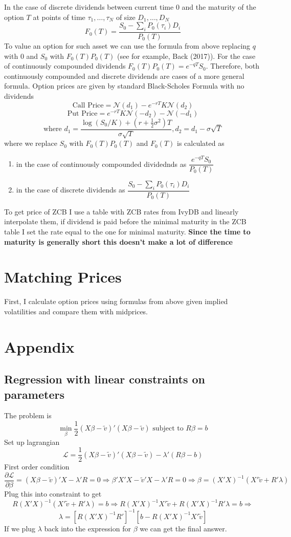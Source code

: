 \documentclass[12pt]{article}
\newcommand{\parder}[2]{\frac{\partial #1}{\partial #2}}
\begin{document}
In the case of discrete dividends between current time $0$ and the maturity of the option $T$ at points of time $\tau_1,\dots, \tau_N$ of size $D_1,\dots, D_N$
\[F_0(T) = \frac{S_0 - \sum_{i}P_0(\tau_{i})D_i}{P_0(T)}\]
To value an option for such asset we can use the formula from above replacing $q$ with $0$ and $S_0$ with $F_0(T)P_0(T)$ (see for example, Back (2017)). For the case of continuously compounded dividends $F_0(T)P_0(T) = e^{-qT}S_0$. Therefore, both continuously compounded and discrete dividends are cases of a more general formula. Option prices are given by standard Black-Scholes Formula with no dividends
\[\text{Call Price} = \mathcal{N}(d_1)-e^{-rT}K\mathcal{N}(d_2)\]
\[\text{Put Price} = e^{-rT}K\mathcal{N}(-d_2) - \mathcal{N}(-d_1)\]
\[\text{where } d_1 = \frac{\log(S_0/K) + (r + \frac{1}{2}\sigma^2)T}{\sigma\sqrt{T}}, d_2 = d_1 - \sigma\sqrt{T}\]
where we replace $S_0$ with $F_0(T)P_0(T)$ and $F_0(T)$ is calculated as
\begin{enumerate}
	\item in the case of continuously compounded dividednds as $\dfrac{e^{-qT}S_0}{P_0(T)}$
	\item in the case of discrete dividends as $\dfrac{S_0 - \sum_{i}P_0(\tau_{i})D_i}{P_0(T)}$
\end{enumerate}

To get price of ZCB I use a table with ZCB rates from IvyDB and linearly interpolate them, if dividend is paid before the minimal maturity in the ZCB table I set the rate equal to the one for minimal maturity. \textbf{\color{red} Since the time to maturity is generally short this doesn't make a lot of difference}

\section{Matching Prices}

First, I calculate option prices using formulas from above given implied volatilities and compare them with midprices.
	



\section{Appendix}

\subsection{Regression with linear constraints on parameters}

The problem is 
\[\min_{\beta} \frac{1}{2}(X\beta - \tilde{v})'(X\beta - \tilde{v}) \text{ subject to } R\beta = b\]
Set up lagrangian
\[\mathcal{L} = \frac{1}{2}(X\beta - \tilde{v})'(X\beta - \tilde{v}) - \lambda' (R\beta - b)\]
First order condition
\[\parder{\mathcal{L}}{\beta} = (X\beta - \tilde{v})'X - \lambda' R = 0 \Rightarrow \beta'X'X - \tilde{v}'X - \lambda'R = 0 \Rightarrow \beta = (X'X)^{-1}(X'\tilde{v} + R'\lambda)\]
Plug this into constraint to get
\[R(X'X)^{-1}(X'\tilde{v} + R'\lambda) = b \Rightarrow R(X'X)^{-1}X'\tilde{v} + R(X'X)^{-1}R'\lambda = b \Rightarrow\] 
\[\lambda = \left[R(X'X)^{-1}R'\right]^{-1}\left[b - R(X'X)^{-1}X'\tilde{v}\right]\]
If we plug $\lambda$ back into the expression for $\beta$ we can get the final answer.
\end{document}
